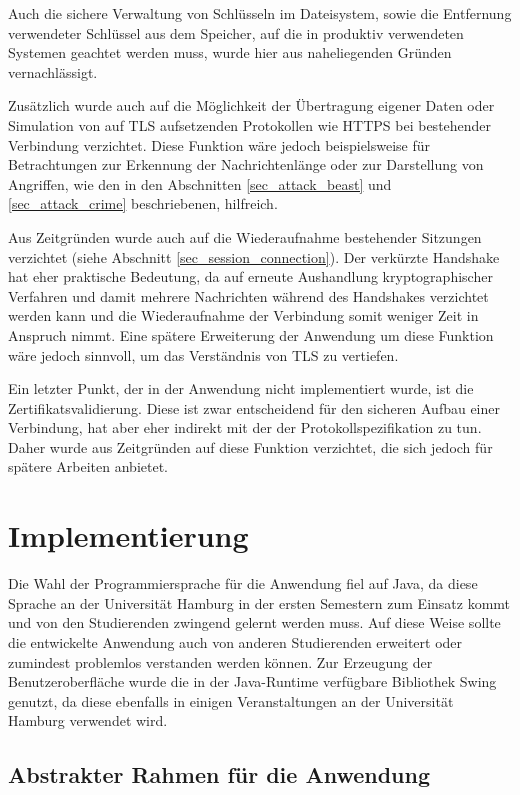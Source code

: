 Auch die sichere Verwaltung von Schlüsseln im Dateisystem, sowie die Entfernung verwendeter Schlüssel aus dem Speicher, auf die in produktiv verwendeten Systemen geachtet werden muss, wurde hier aus naheliegenden Gründen vernachlässigt.

Zusätzlich wurde auch auf die Möglichkeit der Übertragung eigener Daten oder Simulation von auf TLS aufsetzenden Protokollen wie HTTPS bei bestehender Verbindung verzichtet. Diese Funktion wäre jedoch beispielsweise für Betrachtungen zur Erkennung der Nachrichtenlänge oder zur Darstellung von Angriffen, wie den in den Abschnitten \ref{sec_attack_beast} und \ref{sec_attack_crime} beschriebenen, hilfreich.

Aus Zeitgründen wurde auch auf die Wiederaufnahme bestehender Sitzungen verzichtet (siehe Abschnitt \ref{sec_session_connection}). Der verkürzte Handshake hat eher praktische Bedeutung, da auf erneute Aushandlung kryptographischer Verfahren und damit mehrere Nachrichten während des Handshakes verzichtet werden kann und die Wiederaufnahme der Verbindung somit weniger Zeit in Anspruch nimmt. Eine spätere Erweiterung der Anwendung um diese Funktion wäre jedoch sinnvoll, um das Verständnis von TLS zu vertiefen.

Ein letzter Punkt, der in der Anwendung nicht implementiert wurde, ist die Zertifikatsvalidierung. Diese ist zwar entscheidend für den sicheren Aufbau einer Verbindung, hat aber eher indirekt mit der der Protokollspezifikation zu tun. Daher wurde aus Zeitgründen auf diese Funktion verzichtet, die sich jedoch für spätere Arbeiten anbietet.

\section{Implementierung}

Die Wahl der Programmiersprache für die Anwendung fiel auf Java, da diese Sprache an der Universität Hamburg in der ersten Semestern zum Einsatz kommt und von den Studierenden zwingend gelernt werden muss. Auf diese Weise sollte die entwickelte Anwendung auch von anderen Studierenden erweitert oder zumindest problemlos verstanden werden können. Zur Erzeugung der Benutzeroberfläche wurde die in der Java-Runtime verfügbare Bibliothek Swing genutzt, da diese ebenfalls in einigen Veranstaltungen an der Universität Hamburg verwendet wird.

\subsection{Abstrakter Rahmen für die Anwendung}


